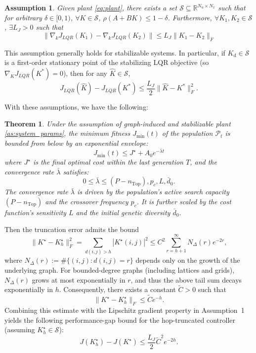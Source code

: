 \documentclass[conference]{IEEEtran}
\newtheorem{theorem}{Theorem}
\newtheorem{assumption}{Assumption}
\begin{document}
\begin{assumption}
Given plant \eqref{eq:plant}, there exists a set $\mathcal{S} \subseteq \mathbb{R}^{N_u \times N_x}$ such that for arbitrary $\delta \in [0,1)$, $\forall K\in\mathcal{S}$, $\rho(A+BK)\le 1-\delta$. Furthermore, $\forall K_1,K_2\in\mathcal{S}$, $\exists L_J>0$ such that 
\begin{equation}
\|\nabla_k J_{LQR}(K_1)-\nabla_k J_{LQR}(K_2)\|\le L_J\|K_1-K_2\|_F
\end{equation}
\end{assumption}

This assumption generally holds for stabilizable systems. 
In particular, if $K_\mathrm{d}\in\mathcal{S}$ is a first-order stationary point of the stabilizing LQR objective (so $\nabla_K J_{LQR}(K^*)=0$), then for any $\hat K\in\mathcal{S}$,
\begin{equation}
J_{LQR}(\hat K)-J_{LQR}(K^*)\le \frac{L_J}{2}\|\hat K-K^*\|_F^2.
\end{equation}

With these assumptions, we have the following:
\begin{theorem} 
\label{thm:convergence}
Under the assumption of graph-induced and stabilizable plant \eqref{as:system_params}, the minimum fitness $J_{\min}(t)$ of the population $\mathcal{P}_t$ is bounded from below by an exponential envelope:
\begin{equation}
\label{eq:exp_lower}
J_{\min}(t) \le J^\star + A_0 e^{-\bar{\lambda} t}
\end{equation}
where $J^\star$ is the final optimal cost within the last generation $T$, and the convergence rate $\bar{\lambda}$ satisfies:
\begin{equation}
0 \le \bar{\lambda} \le (P - n_{\mathrm{Top}}) , p_c , L , \bar{d}_0.
\end{equation}
The convergence rate $\bar{\lambda}$ is driven by the population's active search capacity $(P - n_{\mathrm{Top}})$ and the crossover frequency $p_c$. It is further scaled by the cost function's sensitivity $L$ and the initial genetic diversity $\bar{d}_0$.
\end{theorem}

Then the truncation error admits the bound
\begin{equation}
\|K^\star-K_h^\star\|_F^2
=\sum_{d(i,j)>h}|K^\star(i,j)|^2
\le C^2\sum_{r=h+1}^\infty N_\Delta(r)e^{-2r},
\end{equation}
where $N_\Delta(r):=\#\{(i,j):d(i,j)=r\}$ depends only on the growth of the underlying graph.
For bounded-degree graphs (including lattices and grids), $N_\Delta(r)$ grows at most exponentially in $r$, and thus the above tail sum decays exponentially in $h$.
Consequently, there exists a constant $\tilde C>0$ such that
\begin{equation}
\|K^\star-K_h^\star\|_F \le \tilde C e^{-h}.
\end{equation}
Combining this estimate with the Lipschitz gradient property in Assumption~1 yields the following performance-gap bound for the hop-truncated controller (assuming $K_h^\star\in\mathcal{S}$):
\begin{equation}
J(K_h^\star)-J(K^\star)\le \frac{L_J}{2}\tilde C^2 e^{-2h}.
\end{equation}
\end{document}
